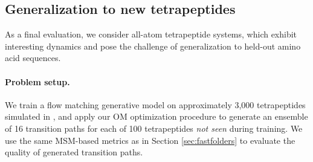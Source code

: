 \subsection{Generalization to new tetrapeptides}
\label{sec:tetrapeptides}
As a final evaluation, we consider all-atom tetrapeptide systems, which exhibit interesting dynamics and pose the challenge of generalization to held-out amino acid sequences.
\vspace{-5pt}
\paragraph{Problem setup.} We train a flow matching generative model on approximately 3,000 tetrapeptides simulated in \citet{jing2024generative}, and apply our OM optimization procedure to generate an ensemble of 16 transition paths for each of 100 tetrapeptides \textit{not seen} during training. We use the same MSM-based metrics as in Section \ref{sec:fastfolders} to evaluate the quality of generated transition paths. 

